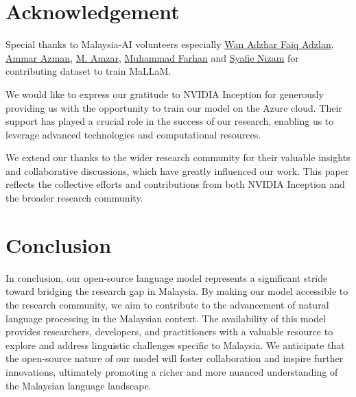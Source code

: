 \documentclass[preprint]{article}
\begin{document}
\section{Acknowledgement}

Special thanks to Malaysia-AI volunteers especially \href{https://www.linkedin.com/in/wan-adzhar-faiq-adzlan-19a27baa/}{Wan Adzhar Faiq Adzlan}, \href{https://www.linkedin.com/in/ammar-azman/}{Ammar Azman}, \href{https://www.linkedin.com/in/amzar96/}{M. Amzar}, \href{https://www.linkedin.com/in/muhammad-farhan-helmy-0529501a7/}{Muhammad Farhan} and \href{https://www.linkedin.com/in/syafie-nizam/}{Syafie Nizam} for contributing dataset to train MaLLaM.

We would like to express our gratitude to NVIDIA Inception for generously providing us with the opportunity to train our model on the Azure cloud. Their support has played a crucial role in the success of our research, enabling us to leverage advanced technologies and computational resources.

We extend our thanks to the wider research community for their valuable insights and collaborative discussions, which have greatly influenced our work. This paper reflects the collective efforts and contributions from both NVIDIA Inception and the broader research community.

\section{Conclusion}

In conclusion, our open-source language model represents a significant stride toward bridging the research gap in Malaysia. By making our model accessible to the research community, we aim to contribute to the advancement of natural language processing in the Malaysian context. The availability of this model provides researchers, developers, and practitioners with a valuable resource to explore and address linguistic challenges specific to Malaysia. We anticipate that the open-source nature of our model will foster collaboration and inspire further innovations, ultimately promoting a richer and more nuanced understanding of the Malaysian language landscape.

{}

\end{document}
